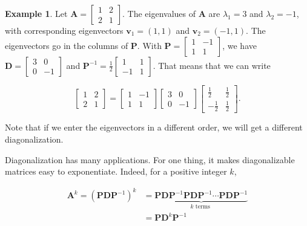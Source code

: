 \documentclass[
]{book}
\theoremstyle{definition}
\theoremstyle{definition}
\newtheorem{example}{Example}[chapter]
\theoremstyle{definition}
\theoremstyle{definition}
\theoremstyle{remark}
\begin{document}
\begin{examplebox}

\begin{example}
\protect\hypertarget{exm:2b2diag}{}\label{exm:2b2diag}Let \(\mathbf{A}=\begin{bmatrix}1 & 2\\2 & 1\end{bmatrix}\). The eigenvalues of \(\mathbf{A}\) are \(\lambda_1=3\) and \(\lambda_2=-1\), with corresponding eigenvectors \(\mathbf{v}_1=(1,1)\) and \(\mathbf{v}_2=(-1,1)\). The eigenvectors go in the columns of \(\mathbf{P}.\) With \(\mathbf{P}=\begin{bmatrix}1 & -1\\1 & 1\end{bmatrix}\), we have \(\mathbf{D}=\begin{bmatrix}3 & 0\\0 & -1\end{bmatrix}\) and \(\mathbf{P}^{-1}=\frac{1}{2}\begin{bmatrix}1 & 1\\-1 & 1\end{bmatrix}\). That means that we can write

\[\begin{bmatrix}1 & 2\\2 & 1\end{bmatrix}=\begin{bmatrix}1 & -1\\1 & 1\end{bmatrix}\begin{bmatrix}3 & 0\\0 & -1\end{bmatrix}\begin{bmatrix}\frac{1}{2} & \frac{1}{2}\\-\frac{1}{2} & \frac{1}{2}\end{bmatrix}.\]

Note that if we enter the eigenvectors in a different order, we will get a different diagonalization.
\end{example}

\end{examplebox}

Diagonalization has many applications. For one thing, it makes diagonalizable matrices easy to exponentiate. Indeed, for a positive integer \(k\),

\begin{align*}
\mathbf{A}^k=(\mathbf{P}\mathbf{D}\mathbf{P}^{-1})^k&=\underbrace{\mathbf{P}\mathbf{D}\mathbf{P}^{-1}\mathbf{P}\mathbf{D}\mathbf{P}^{-1}\cdots\mathbf{P}\mathbf{D}\mathbf{P}^{-1}}_{k \text{ terms }}\\
&=\mathbf{P}\mathbf{D}^k\mathbf{P}^{-1}
\end{align*}
\end{document}
